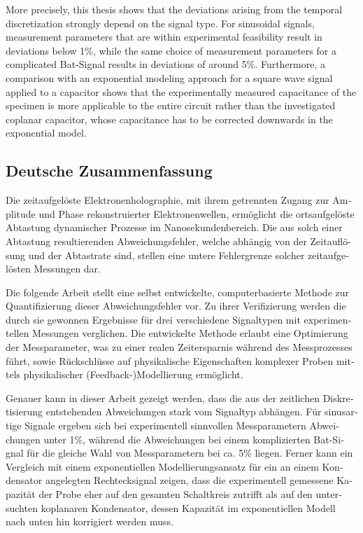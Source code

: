 More precisely, this thesis shows that the deviations arising from the temporal discretization strongly depend on the signal type. For sinusoidal signals, measurement parameters that are within experimental feasibility result in deviations below 1\%, while the same choice of measurement parameters for a complicated Bat-Signal results in deviations of around 5\%. Furthermore, a comparison with an exponential modeling approach for a square wave signal applied to a capacitor shows that the experimentally measured capacitance of the specimen is more applicable to the entire circuit rather than the investigated coplanar capacitor, whose capacitance has to be corrected downwards in the exponential model.
\begin{otherlanguage}{ngerman}
\section*{Deutsche Zusammenfassung}
Die zeitaufgelöste Elektronenholographie, mit ihrem getrennten Zugang zur Amplitude und Phase rekonstruierter Elektronenwellen, ermöglicht die ortsaufgelöste Abtastung dynamischer Prozesse im Nanosekundenbereich. Die aus solch einer Abtastung resultierenden Abweichungsfehler, welche abhängig von der Zeitauflösung und der Abtastrate sind, stellen eine untere Fehlergrenze solcher zeitaufgelösten Messungen dar.

Die folgende Arbeit stellt eine selbst entwickelte, computerbasierte Methode zur Quantifizierung dieser Abweichungsfehler vor. Zu ihrer Verifizierung werden die durch sie gewonnen Ergebnisse für drei verschiedene Signaltypen mit experimentellen Messungen verglichen. Die entwickelte Methode erlaubt eine Optimierung der Messparameter, was zu einer realen Zeitersparnis während des Messprozesses führt, sowie Rückschlüsse auf physikalische Eigenschaften komplexer Proben mittels physikalischer (Feedback-)Modellierung ermöglicht.

Genauer kann in dieser Arbeit gezeigt werden, dass die aus der zeitlichen Diskretisierung entstehenden Abweichungen stark vom Signaltyp abhängen. Für sinusartige Signale ergeben sich bei experimentell sinnvollen Messparametern Abweichungen unter 1\%, während die Abweichungen bei einem komplizierten Bat-Signal für die gleiche Wahl von Messparametern bei ca. 5\% liegen. Ferner kann ein Vergleich mit einem exponentiellen Modellierungsansatz für ein an einem Kondensator angelegten Rechtecksignal zeigen, dass die experimentell gemessene Kapazität der Probe eher auf den gesamten Schaltkreis zutrifft als auf den untersuchten koplanaren Kondensator, dessen Kapazität im exponentiellen Modell nach unten hin korrigiert werden muss.
\end{otherlanguage}
